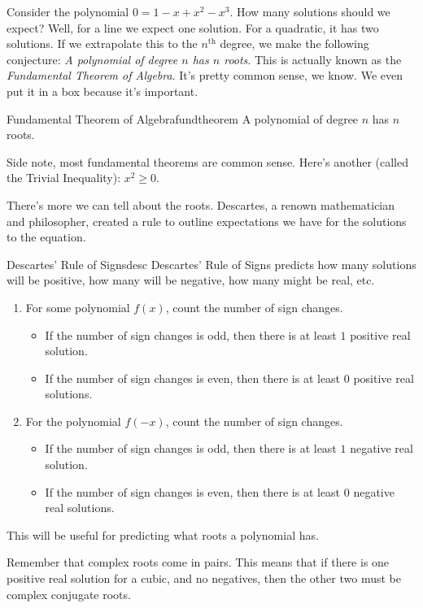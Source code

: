 \documentclass[lang=en,11pt]{elegantbook}
\begin{document}
Consider the polynomial $0=1-x+x^2-x^3$. How many solutions should we expect? Well, for a line we expect one solution.  For a quadratic, it has two solutions.  If we extrapolate this to the $n^{\text{th}}$ degree, we make the following conjecture: \textit{A polynomial of degree $n$ has $n$ roots}.  This is actually known as the \textit{Fundamental Theorem of Algebra}. It's pretty common sense, we know. We even put it in a box because it's important.
\begin{theorem}{Fundamental Theorem of Algebra}{fundtheorem}
A polynomial of degree $n$ has $n$ roots.
\end{theorem}

\begin{remark}
Side note, most fundamental theorems are common sense.  Here's another (called the Trivial Inequality): $x^2\geq 0$.
\end{remark}

There's more we can tell about the roots.  Descartes, a renown mathematician and philosopher, created a rule to outline expectations we have for the solutions to the equation.  
\begin{theorem}{Descartes' Rule of Signs}{desc}
Descartes' Rule of Signs predicts how many solutions will be positive, how many will be negative, how many might be real, etc.
\begin{enumerate}
    \item For some polynomial $f(x)$, count the number of sign changes. \begin{itemize}
        \item If the number of sign changes is odd, then there is at least $1$ positive real solution.
        \item If the number of sign changes is even, then there is at least $0$ positive real solutions.
        \end{itemize}
    \item For the polynomial $f(-x)$, count the number of sign changes. \begin{itemize}
        \item If the number of sign changes is odd, then there is at least $1$ negative real solution.
        \item If the number of sign changes is even, then there is at least $0$ negative real solutions.
    \end{itemize}
\end{enumerate}
This will be useful for predicting what roots a polynomial has.
\end{theorem}
\begin{remark}
Remember that complex roots come in pairs.  This means that if there is one positive real solution for a cubic, and no negatives, then the other two must be complex conjugate roots.
\end{remark}
\end{document}
